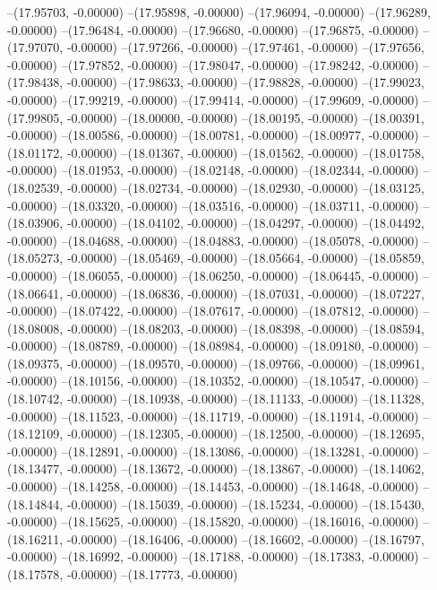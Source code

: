 --(17.95703, -0.00000)
--(17.95898, -0.00000)
--(17.96094, -0.00000)
--(17.96289, -0.00000)
--(17.96484, -0.00000)
--(17.96680, -0.00000)
--(17.96875, -0.00000)
--(17.97070, -0.00000)
--(17.97266, -0.00000)
--(17.97461, -0.00000)
--(17.97656, -0.00000)
--(17.97852, -0.00000)
--(17.98047, -0.00000)
--(17.98242, -0.00000)
--(17.98438, -0.00000)
--(17.98633, -0.00000)
--(17.98828, -0.00000)
--(17.99023, -0.00000)
--(17.99219, -0.00000)
--(17.99414, -0.00000)
--(17.99609, -0.00000)
--(17.99805, -0.00000)
--(18.00000, -0.00000)
--(18.00195, -0.00000)
--(18.00391, -0.00000)
--(18.00586, -0.00000)
--(18.00781, -0.00000)
--(18.00977, -0.00000)
--(18.01172, -0.00000)
--(18.01367, -0.00000)
--(18.01562, -0.00000)
--(18.01758, -0.00000)
--(18.01953, -0.00000)
--(18.02148, -0.00000)
--(18.02344, -0.00000)
--(18.02539, -0.00000)
--(18.02734, -0.00000)
--(18.02930, -0.00000)
--(18.03125, -0.00000)
--(18.03320, -0.00000)
--(18.03516, -0.00000)
--(18.03711, -0.00000)
--(18.03906, -0.00000)
--(18.04102, -0.00000)
--(18.04297, -0.00000)
--(18.04492, -0.00000)
--(18.04688, -0.00000)
--(18.04883, -0.00000)
--(18.05078, -0.00000)
--(18.05273, -0.00000)
--(18.05469, -0.00000)
--(18.05664, -0.00000)
--(18.05859, -0.00000)
--(18.06055, -0.00000)
--(18.06250, -0.00000)
--(18.06445, -0.00000)
--(18.06641, -0.00000)
--(18.06836, -0.00000)
--(18.07031, -0.00000)
--(18.07227, -0.00000)
--(18.07422, -0.00000)
--(18.07617, -0.00000)
--(18.07812, -0.00000)
--(18.08008, -0.00000)
--(18.08203, -0.00000)
--(18.08398, -0.00000)
--(18.08594, -0.00000)
--(18.08789, -0.00000)
--(18.08984, -0.00000)
--(18.09180, -0.00000)
--(18.09375, -0.00000)
--(18.09570, -0.00000)
--(18.09766, -0.00000)
--(18.09961, -0.00000)
--(18.10156, -0.00000)
--(18.10352, -0.00000)
--(18.10547, -0.00000)
--(18.10742, -0.00000)
--(18.10938, -0.00000)
--(18.11133, -0.00000)
--(18.11328, -0.00000)
--(18.11523, -0.00000)
--(18.11719, -0.00000)
--(18.11914, -0.00000)
--(18.12109, -0.00000)
--(18.12305, -0.00000)
--(18.12500, -0.00000)
--(18.12695, -0.00000)
--(18.12891, -0.00000)
--(18.13086, -0.00000)
--(18.13281, -0.00000)
--(18.13477, -0.00000)
--(18.13672, -0.00000)
--(18.13867, -0.00000)
--(18.14062, -0.00000)
--(18.14258, -0.00000)
--(18.14453, -0.00000)
--(18.14648, -0.00000)
--(18.14844, -0.00000)
--(18.15039, -0.00000)
--(18.15234, -0.00000)
--(18.15430, -0.00000)
--(18.15625, -0.00000)
--(18.15820, -0.00000)
--(18.16016, -0.00000)
--(18.16211, -0.00000)
--(18.16406, -0.00000)
--(18.16602, -0.00000)
--(18.16797, -0.00000)
--(18.16992, -0.00000)
--(18.17188, -0.00000)
--(18.17383, -0.00000)
--(18.17578, -0.00000)
--(18.17773, -0.00000)
